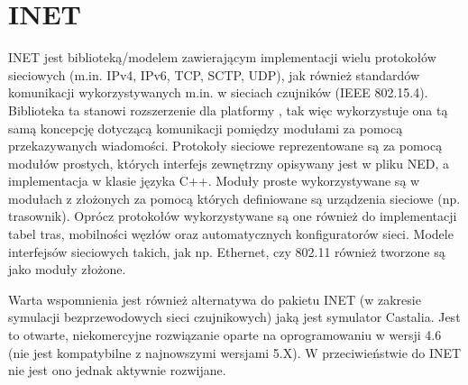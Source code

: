 \section{INET}
INET jest biblioteką/modelem zawierającym implementacji wielu protokołów sieciowych (m.in. IPv4, IPv6, TCP, SCTP, UDP), jak również standardów komunikacji wykorzystywanych m.in. w sieciach czujników (IEEE 802.15.4)\cite{inet}. Biblioteka ta stanowi rozszerzenie dla platformy \omnetpp, tak więc wykorzystuje ona tą samą koncepcję dotyczącą komunikacji pomiędzy modułami za pomocą przekazywanych wiadomości. Protokoły sieciowe reprezentowane są za pomocą modułów prostych, których interfejs zewnętrzny opisywany jest w pliku NED, a implementacja w klasie języka C++. Moduły proste wykorzystywane są w modułach z złożonych za pomocą których definiowane są urządzenia sieciowe (np. trasownik). Oprócz protokołów wykorzystywane są one również do implementacji tabel tras, mobilności węzłów oraz automatycznych konfiguratorów sieci. Modele interfejsów sieciowych takich, jak np. Ethernet, czy 802.11 również tworzone są jako moduły złożone.

Warta wspomnienia jest również alternatywa do pakietu INET (w zakresie symulacji bezprzewodowych sieci czujnikowych) jaką jest symulator Castalia. Jest to otwarte, niekomercyjne rozwiązanie oparte na oprogramowaniu \omnetpp w wersji 4.6 (nie jest kompatybilne z najnowszymi wersjami \omnetpp 5.X). W przeciwieństwie do INET nie jest ono jednak aktywnie rozwijane. 
